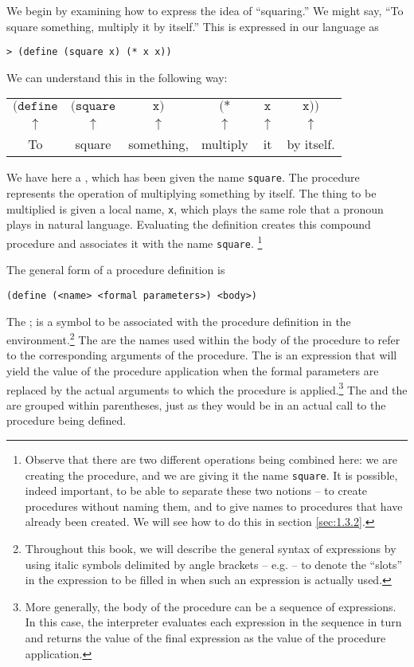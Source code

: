 We begin by examining how to express the idea of ``squaring.''  We
might say, ``To square something, multiply it by itself.''  This is
expressed in our language as 

\begin{verbatim}
> (define (square x) (* x x))
\end{verbatim}

We can understand this in the following way:

\begin{tabular}{cccccc}
  $\texttt{(define}$ & $\texttt{(square}$ & $\texttt{x)}$ & $\texttt{(*}$ & $\texttt{x}$ & $\texttt{x))}$ \\
  $\uparrow{}$ & $\uparrow{}$ & $\uparrow{}$ & $\uparrow{}$ & $\uparrow{}$ & $\uparrow{}$ \\
  To & square & something, & multiply & it & by itself.
\end{tabular}

We have here a , which has been given the
name \texttt{square}.  The procedure represents the operation of
multiplying something by itself.  The thing to be multiplied is given
a local name, \texttt{x}, which plays the same role that a pronoun
plays in natural language.  Evaluating the definition creates this
compound procedure and associates it with the name \texttt{square}.
\footnote{Observe that there are two different operations being
  combined here: we are creating the procedure, and we are giving it
  the name \texttt{square}.  It is possible, indeed important, to be
  able to separate these two notions -- to create procedures without
  naming them, and to give names to procedures that have already been
  created.  We will see how to do this in section \ref{sec:1.3.2}.}


The general form of a procedure definition is

\begin{verbatim}
(define (<name> <formal parameters>) <body>)
\end{verbatim}

The ; is a symbol to be associated with the procedure
definition in the environment.\footnote{Throughout this book, we will
  describe the general syntax of expressions by using italic symbols
  delimited by angle brackets -- e.g.  -- to denote the
  ``slots'' in the expression to be filled in when such an expression
  is actually used.} The  are the names used
within the body of the procedure to refer to the corresponding
arguments of the procedure.  The  is an expression that
will yield the value of the procedure application when the formal
parameters are replaced by the actual arguments to which the procedure
is applied.\footnote{More generally, the body of the procedure can be
  a sequence of expressions.  In this case, the interpreter evaluates
  each expression in the sequence in turn and returns the value of the
  final expression as the value of the procedure application.}  The
 and the  are grouped within
parentheses, just as they would be in an actual call to the procedure
being defined.

